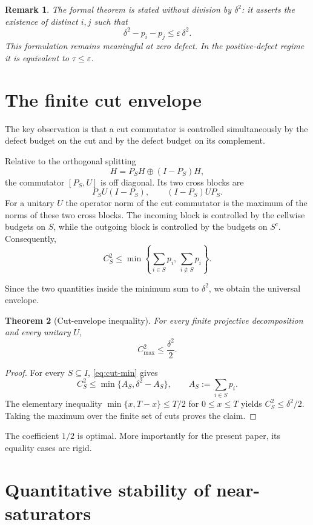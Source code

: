 \documentclass[11pt]{article}
\newtheorem{theorem}{Theorem}[section]
\newtheorem{remark}[theorem]{Remark}
\newcommand{\cmax}{C_{\max}}
\newcommand{\dd}{\delta}
\newcommand{\tauq}{\tau}
\begin{document}
\begin{remark}
The formal theorem is stated without division by $\dd^2$: it asserts the
existence of distinct $i,j$ such that
\[
  \dd^2-p_i-p_j\le \varepsilon\,\dd^2.
\]
This formulation remains meaningful at zero defect.  In the positive-defect
regime it is equivalent to $\tauq\le\varepsilon$.
\end{remark}

\section{The finite cut envelope}

The key observation is that a cut commutator is controlled simultaneously by
the defect budget on the cut and by the defect budget on its complement.

Relative to the orthogonal splitting
\[
  H=P_SH\oplus (I-P_S)H,
\]
the commutator $[P_S,U]$ is off diagonal.  Its two cross blocks are
\[
  P_SU(I-P_S),
  \qquad
  (I-P_S)UP_S.
\]
For a unitary $U$ the operator norm of the cut commutator is the maximum of
the norms of these two cross blocks.  The incoming block is controlled by the
cellwise budgets on $S$, while the outgoing block is controlled by the
budgets on $S^c$.  Consequently,
\begin{equation}\label{eq:cut-min}
  C_S^2
  \le
  \min\left\{
    \sum_{i\in S}p_i,\,
    \sum_{i\notin S}p_i
  \right\}.
\end{equation}

Since the two quantities inside the minimum sum to $\dd^2$, we obtain the
universal envelope.

\begin{theorem}[Cut-envelope inequality]\label{thm:envelope}
For every finite projective decomposition and every unitary $U$,
\[
  \boxed{\cmax^2\le\frac{\dd^2}{2}}.
\]
\end{theorem}

\begin{proof}
For every $S\subseteq I$, \eqref{eq:cut-min} gives
\[
  C_S^2
  \le
  \min\{A_S,\dd^2-A_S\},
  \qquad
  A_S:=\sum_{i\in S}p_i.
\]
The elementary inequality
$\min\{x,T-x\}\le T/2$ for $0\le x\le T$ yields
$C_S^2\le\dd^2/2$.  Taking the maximum over the finite set of cuts proves the
claim.
\end{proof}

The coefficient $1/2$ is optimal.  More importantly for the present paper,
its equality cases are rigid.

\section{Quantitative stability of near-saturators}
\end{document}
